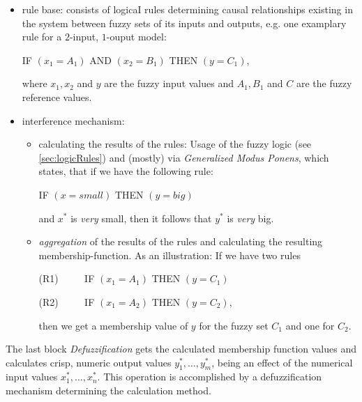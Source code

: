\begin{itemize}
\item rule base: consists of logicaI rules determining causal relationships
existing in the system between fuzzy sets of its inputs and outputs, e.g. one examplary rule for a $2$-input, $1$-ouput model:
	\begin{center} IF $(x_1=A_1)$ AND $(x_2=B_1)$ THEN $(y=C_1)$, \end{center}
	where $x_1,x_2$ and $y$ are the fuzzy input values and $A_1,B_1$ and $C$ are the fuzzy reference values.
\item interference mechanism:
	\begin{itemize}
	\item calculating the results of the rules: Usage of the fuzzy logic (see \ref{sec:logicRules}) and (mostly) via \emph{Generalized Modus Ponens}, which states, that if we have the following rule:
		\begin{center} IF $(x=small)$ THEN $(y=big)$ \end{center}
	and $x^*$ is \textit{very} small, then it follows that $y^*$ is \textit{very} big.
	\item \emph{aggregation} of the results of the rules and calculating the resulting membership-function. As an illustration: If we have two rules
		\begin{center} (R1) $\qquad$ IF $(x_1=A_1)$ THEN $(y=C_1)$ \end{center}
		\begin{center} (R2) $\qquad$ IF $(x_1=A_2)$ THEN $(y=C_2)$, \end{center}
	then we get a membership value of $y$ for the fuzzy set $C_1$ and one for $C_2$.
	\end{itemize}
\end{itemize}
The last block \emph{Defuzzification} gets the calculated membership function values and calculates crisp, numeric output values $y_1^{\ast},\hdots,y_m^{\ast}$, being an effect of the numerical input values $x_1^{\ast},\hdots,x_n^{\ast}$. This operation is accomplished by a defuzzification mechanism determining the calculation method.


